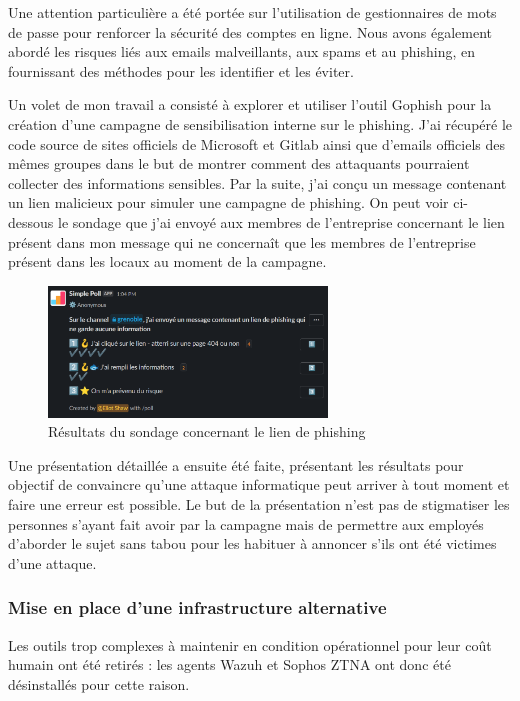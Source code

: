 Une attention particulière a été portée sur l'utilisation de gestionnaires de mots de passe pour renforcer la sécurité des comptes en ligne.
Nous avons également abordé les risques liés aux emails malveillants, aux spams et au phishing, en fournissant des méthodes pour les identifier et les éviter.

Un volet de mon travail a consisté à explorer et utiliser l'outil Gophish pour la création d'une campagne de sensibilisation interne sur le phishing.
J'ai récupéré le code source de sites officiels de Microsoft et Gitlab ainsi que d'emails officiels des mêmes groupes dans le but de montrer comment des attaquants pourraient collecter des informations sensibles.
Par la suite, j'ai conçu un message contenant un lien malicieux pour simuler une campagne de phishing.
On peut voir ci-dessous le sondage que j'ai envoyé aux membres de l'entreprise concernant le lien présent dans mon message qui ne concernaît que les membres de l'entreprise présent dans les locaux au moment de la campagne.

\begin{figure}[ht!]
    \centering
    \includegraphics[width=0.66\textwidth]{paper/figures/poll.png}
    \caption{Résultats du sondage concernant le lien de phishing}
    \label{fig:poll}
\end{figure}

Une présentation détaillée a ensuite été faite, présentant les résultats pour objectif de convaincre qu'une attaque informatique peut arriver à tout moment et faire une erreur est possible.
Le but de la présentation n'est pas de stigmatiser les personnes s'ayant fait avoir par la campagne mais de permettre aux employés d'aborder le sujet sans tabou pour les habituer à annoncer s'ils ont été victimes d'une attaque.


\subsubsection{Mise en place d'une infrastructure alternative}
Les outils trop complexes à maintenir en condition opérationnel pour leur coût humain ont été retirés : les agents Wazuh et Sophos ZTNA ont donc été désinstallés pour cette raison.

